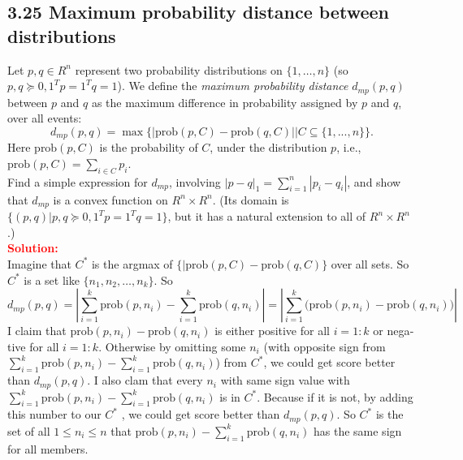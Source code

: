 \begin{latin}

\section{3.25 Maximum probability distance between distributions}
Let $ p,q \in R^{n}$ represent two probability distributions on $ \{1, \dots , n\} $ (so $ p,q \succeq 0, 1^{T} p = 1^{T} q = 1 $). We define the \textit{maximum
	probability distance} $ d_{mp}(p, q) $ between $ p $ and $ q $ as the maximum difference in probability assigned by $ p $ and $ q $, over all events:
\begin{equation*}
	d_{mp}(p, q) = \max\{| \text{prob}(p, C) - \text{prob}(q, C)| | C \subseteq \{1, . . . , n\}\}.
\end{equation*}
Here $ \text{prob}(p, C) $ is the probability of $ C $, under the distribution $ p $, i.e., $ \text{prob}(p, C) = \sum_{i\in C} p_{i} $. \\
Find a simple expression for $ d_{mp} $, involving $ |p - q|_{1} = \sum_{i=1}^{n} |p_{i} - q_{i}| $, and show that $ d_{mp} $ is a convex function on $ R^{n} \times R^{n} $. (Its domain is $ \{(p, q) | p, q \succeq 0, 1^{T} p = 1^{T} q = 1\} $, but
it has a natural extension to all of $ R^{n} \times R^{n} $.)
\\
\textcolor{red}{\textbf{Solution:}}
\\
Imagine that $ C^{*} $ is the argmax of $ \{| \text{prob}(p, C) - \text{prob}(q, C)\} $ over all sets. So $ C^{*} $ is a set like $ \{ n_{1}, n_{2}, \dots, n_{k}\} $. So 
\begin{equation*}
	d_{mp}(p, q) = |\sum_{i=1}^{k} \text{prob}(p, n_{i}) - \sum_{i=1}^{k} \text{prob}(q, n_{i})| = |\sum_{i=1}^{k} \big(\text{prob}(p, n_{i}) - \text{prob}(q, n_{i})\big)|
\end{equation*}
I claim that $ \text{prob}(p, n_{i}) - \text{prob}(q, n_{i}) $ is either positive for all $ i = 1:k $ or negative for all $ i = 1:k $. Otherwise by omitting some $ n_{i} $ (with opposite sign from $ \sum_{i=1}^{k} \text{prob}(p, n_{i}) - \sum_{i=1}^{k} \text{prob}(q, n_{i}) $) from $ C^{*} $, we could get score better than $ d_{mp}(p, q) $. I also clam that every $ n_{i} $ with same sign value with $ \sum_{i=1}^{k} \text{prob}(p, n_{i}) - \sum_{i=1}^{k} \text{prob}(q, n_{i}) $ is in $ C^{*} $. Because if it is not, by adding this number to our  $ C^{*} $ , we could get score better than $ d_{mp}(p, q) $. So $ C^{*} $ is the set of all $ 1 \leq n_{i} \leq n $ that $ \text{prob}(p, n_{i}) - \sum_{i=1}^{k} \text{prob}(q, n_{i}) $ has the same sign for all members.


\end{latin}
